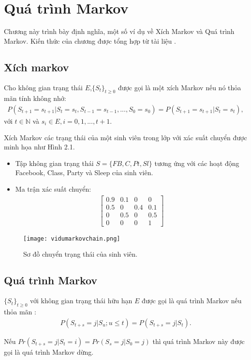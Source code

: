 \chapter{Quá trình Markov}
\label{ch:02}
	Chương này trình bày định nghĩa, một số ví dụ về Xích Markov và Quá trình Markov. Kiến thức của chương được tổng hợp từ tài liệu \cite{Gagniuc2017}.
\section{Xích markov}
\begin{dn} \rm
Cho không gian trạng thái $E$,$\lbrace S_{t}\rbrace _{t\geq 0}$ được gọi là một xích Markov nếu nó thỏa mãn tính không nhớ:
\begin{align}
P(S_{t+1}=s_{t+1}|S_{t}=s_{t},S_{t-1}=s_{t-1},...,S_{0}=s_{0}) = P(S_{t+1}=s_{t+1}|S_{t}=s_{t}),
\end{align}
với $t\in \mathbb{N}$ và $s_{i} \in E, i = 0,1,...,t+1.$
\end{dn}

\begin{vd}
Xích Markov các trạng thái của một sinh viên trong lớp với xác suất chuyển được minh họa như Hình 2.1. 
\begin{itemize}
\item Tập không gian trạng thái $S = \lbrace FB,C,Pt,Sl \rbrace $ tương ứng với các hoạt động Facebook, Class, Party và Sleep của sinh viên.
\item Ma trận xác suất chuyển:
\begin{align*}
\begin{bmatrix}
0.9&  0.1&  0& 0\\ 
0.5&  0&  0.4& 0.1\\ 
0&  0.5& 0 & 0.5\\ 
0 & 0 & 0 & 1
\end{bmatrix}
\end{align*}
\end{itemize}
\newpage
\begin{figure}[ht] {\label{h2.1}}
    \centering
    \texttt{[image: vidumarkovchain.png]}
    \caption{Sơ đồ chuyển trạng thái của sinh viên.}
    \label{fig:tactumoitruong}
\end{figure}
\end{vd}
\section{Quá trình Markov}
\begin{dn} \rm
$\lbrace S_{t}\rbrace _{t\geq 0}$ với không gian trạng thái hữu hạn $E$ được gọi là quá trình Markov nếu thỏa mãn :
\begin{align}
P(S_{t+s}=j|S_{u};u\leq t)=P(S_{t+s}=j|S_{t}).
\end{align}
\end{dn}
\begin{nx} \rm
Nếu $Pr(S_{t+s}=j|S_{t}=i)=Pr(S_{s}=j|S_{0}=j)$ thì quá trình Markov này được gọi là quá trình Markov dừng.
\end{nx}